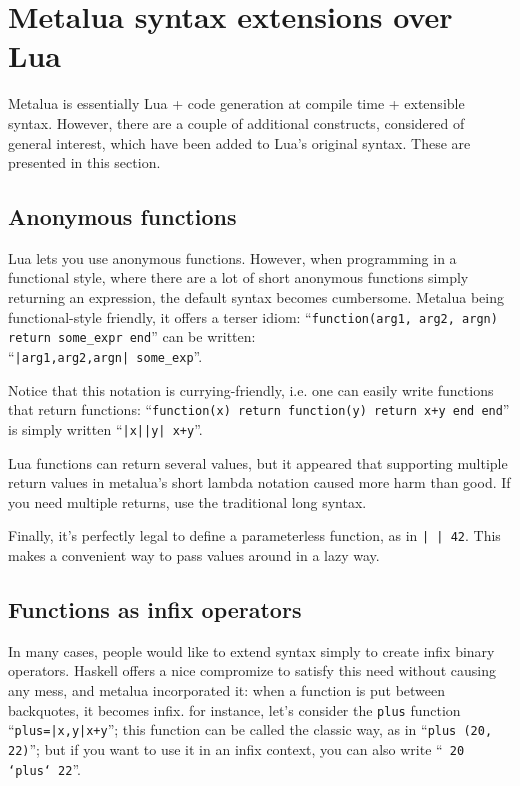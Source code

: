 \section[Metalua extensions]{Metalua syntax extensions over Lua}
Metalua is essentially Lua + code generation at compile time +
extensible syntax. However, there are a couple of additional
constructs, considered of general interest, which have been added to
Lua's original syntax. These are presented in this section.

\subsection{Anonymous functions}
Lua lets you use anonymous functions. However, when programming in a
functional style, where there are a lot of short anonymous functions
simply returning an expression, the default syntax becomes
cumbersome. Metalua being functional-style friendly, it offers a
terser idiom: ``{\tt function(arg1, arg2, argn) return some\_expr
  end}'' can be written:\\
``{\tt|arg1,arg2,argn| some\_exp}''.

Notice that this notation is currying-friendly, i.e. one can easily
write functions that return functions: ``{\tt function(x) return
function(y) return x+y end end}'' is simply written ``{\tt|x||y|
x+y}''.

Lua functions can return several values, but it appeared that
supporting multiple return values in metalua's short lambda notation
caused more harm than good. If you need multiple returns, use the
traditional long syntax.

Finally, it's perfectly legal to define a parameterless function, as
in {\tt | | 42}. This makes a convenient way to pass values around in a
lazy way.

\subsection{Functions as infix operators}

In many cases, people would like to extend syntax simply to create
infix binary operators. Haskell offers a nice compromize to satisfy
this need without causing any mess, and metalua incorporated it: when
a function is put between backquotes, it becomes infix. for instance,
let's consider the {\tt plus} function ``{\tt plus=|x,y|x+y}''; this
function can be called the classic way, as in ``{\tt plus (20, 22)}''; but
if you want to use it in an infix context, you can also write ``{\tt
20 `plus` 22}''.


